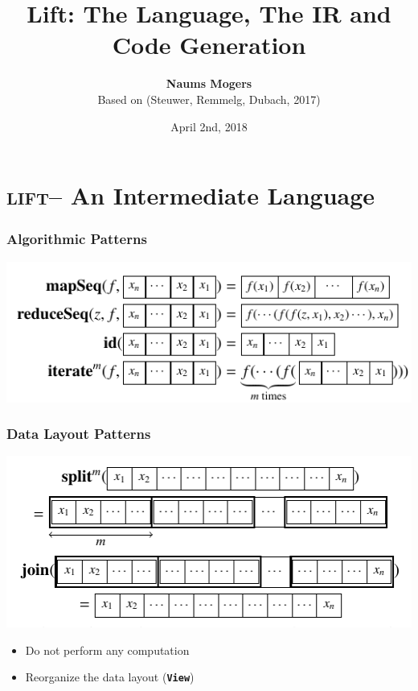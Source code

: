 \documentclass[10pt]{beamer}
\title{Lift: The Language, The IR and Code Generation}
\date{April 2nd, 2018}
\author{\textbf{Naums Mogers}\\Based on (Steuwer, Remmelg, Dubach, 2017)}
\institute{University of Edinburgh}
\newcommand{\lift}{\textsc{lift}\space}
\newcommand{\code}[1]{\textbf{\texttt{#1}}}
\begin{document}
\begin{frame}
\maketitle
\end{frame}

\section{\lift -- An Intermediate Language}
\begin{frame}
\frametitle{Algorithmic Patterns}
    \begin{block}{}
        \begin{center}
            \includegraphics[width=.85\textwidth]{../images/algorithmic_patterns.pdf}
        \end{center}
    \end{block}
\end{frame}

\begin{frame}
\frametitle{Data Layout Patterns}
    \begin{block}{}
        \begin{center}
            \includegraphics[width=.85\textwidth]{../images/data_layout_patterns1.pdf}
        \end{center}
    \end{block}
\begin{itemize}
	\item Do not perform any computation
	\item Reorganize the data layout (\code{View})
\end{itemize}
\end{frame}
\end{document}

